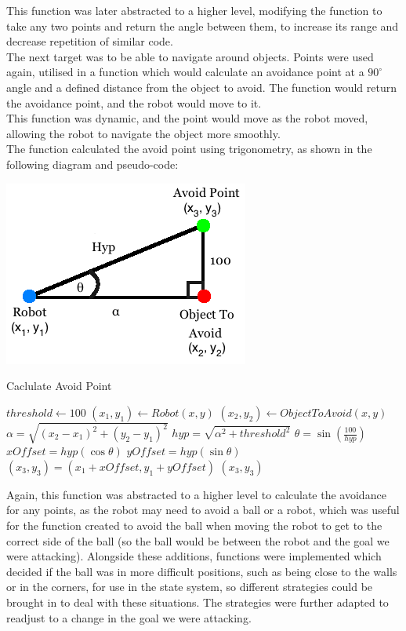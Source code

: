 This function was later abstracted to a higher level, modifying the function to take any two points and return the angle between them, to increase its range and decrease repetition of similar code. \\
The next target was to be able to navigate around objects. Points were used again, utilised in a function which would calculate an avoidance point at a $90^{\circ}$ angle and a defined distance from the object to avoid. The function would return the avoidance point, and the robot would move to it. \\
This function was dynamic, and the point would move as the robot moved, allowing the robot to navigate the object more smoothly.\\
The function calculated the avoid point using trigonometry, as shown in the following diagram and pseudo-code:\\
\begin{center}
\includegraphics[scale=0.6]{images/AvoidPoints.png}\\
\end{center}

\begin{algorithm}
\caption{Caclulate Avoid Point}
\begin{algorithmic}[1]
\STATE $threshold \gets 100$
\STATE $(x_{1}, y_{1}) \gets Robot (x, y)$
\STATE $(x_{2}, y_{2}) \gets Object To Avoid (x, y)$
\STATE $\alpha = \sqrt{(x_{2} - x_{1})^{2} + (y_{2} - y_{1})^{2}}$
\STATE $hyp = \sqrt{\alpha^{2} + threshold^{2}}$
\STATE $\theta = \sin(\frac{100}{hyp})$
\STATE $xOffset = hyp(\cos\theta)$
\STATE $yOffset = hyp(\sin\theta)$
\STATE $(x_{3}, y_{3}) = (x_{1} + xOffset, y_{1} + yOffset)$
\RETURN $(x_{3}, y_{3})$
\end{algorithmic}
\end{algorithm}

Again, this function was abstracted to a higher level to calculate the avoidance for any points, as the robot may need to avoid a ball or a robot, which was useful for the function created to avoid the ball when moving the robot to get to the correct side of the ball (so the ball would be between the robot and the goal we were attacking). \linebreak
Alongside these additions, functions were implemented which decided if the ball was in more difficult positions, such as being close to the walls or in the corners, for use in the state system, so different strategies could be brought in to deal with these situations. The strategies were further adapted to readjust to a change in the goal we were attacking. 

